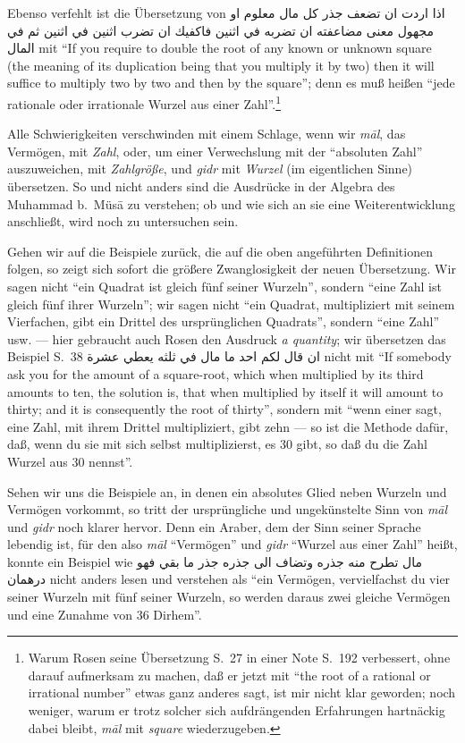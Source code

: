 \documentclass[11pt,a4paper]{article}
\newcommand{\RL}[1]{\beginR#1\endR}
\newcommand{\ar}[1]{{\arabicfont\RL{#1}}}
\newcommand{\enquote}[1]{``#1''}
\begin{document}
Ebenso verfehlt ist die \"Ubersetzung von \ar{اذا اردت ان تضعف جذر كل مال معلوم او مجهول معنى مضاعفته ان تضربه في اثنين فاكفيك ان تضرب اثنين في اثنين ثم في المال} mit \enquote{If you require to double the root of any known or unknown square (the meaning of its duplication being that you multiply it by two) then it will suffice to multiply two by two and then by the square}; denn es mu\ss{} hei\ss{}en \enquote{jede rationale oder irrationale Wurzel aus einer Zahl}.\footnote{Warum Rosen seine \"Ubersetzung S.\ 27 in einer Note S.\ 192 verbessert, ohne darauf aufmerksam zu machen, da\ss{} er jetzt mit \enquote{the root of a rational or irrational number} etwas ganz anderes sagt, ist mir nicht klar geworden; noch weniger, warum er trotz solcher sich aufdr\"angenden Erfahrungen hartn\"ackig dabei bleibt, \textit{m\=al} mit \textit{square} wiederzugeben.}

Alle Schwierigkeiten verschwinden mit einem Schlage, wenn wir \textit{m\=al}, das Verm\"ogen, mit \textit{Zahl}, oder, um einer Verwechslung mit der \enquote{absoluten Zahl} auszuweichen, mit \textit{Zahlgr\"o\ss{}e}, und \textit{gidr} mit \textit{Wurzel} (im eigentlichen Sinne) \"ubersetzen. So und nicht anders sind die Ausdr\"ucke in der Algebra des Muhammad b.\ M\"us\=a zu verstehen; ob und wie sich an sie eine Weiterentwicklung anschlie\ss{}t, wird noch zu untersuchen sein.

Gehen wir auf die Beispiele zur\"uck, die auf die oben angef\"uhrten Definitionen folgen, so zeigt sich sofort die gr\"o\ss{}ere Zwanglosigkeit der neuen \"Ubersetzung. Wir sagen nicht \enquote{ein Quadrat ist gleich f\"unf seiner Wurzeln}, sondern \enquote{eine Zahl ist gleich f\"unf ihrer Wurzeln}; wir sagen nicht \enquote{ein Quadrat, multipliziert mit seinem Vierfachen, gibt ein Drittel des urspr\"unglichen Quadrats}, sondern \enquote{eine Zahl} usw. --- hier gebraucht auch Rosen den Ausdruck \textit{a quantity}; wir \"ubersetzen das Beispiel S.\ 38 \ar{ان قال لكم احد ما مال في ثلثه يعطي عشرة} nicht mit \enquote{If somebody ask you for the amount of a square-root, which when multiplied by its third amounts to ten, the solution is, that when multiplied by itself it will amount to thirty; and it is consequently the root of thirty}, sondern mit \enquote{wenn einer sagt, eine Zahl, mit ihrem Drittel multipliziert, gibt zehn --- so ist die Methode daf\"ur, da\ss{}, wenn du sie mit sich selbst multiplizierst, es 30 gibt, so da\ss{} du die Zahl Wurzel aus 30 nennst}.

Sehen wir uns die Beispiele an, in denen ein absolutes Glied neben Wurzeln und Verm\"ogen vorkommt, so tritt der urspr\"ungliche und ungek\"unstelte Sinn von \textit{m\=al} und \textit{gidr} noch klarer hervor. Denn ein Araber, dem der Sinn seiner Sprache lebendig ist, f\"ur den also \textit{m\=al} \enquote{Verm\"ogen} und \textit{gidr} \enquote{Wurzel aus einer Zahl} hei\ss{}t, konnte ein Beispiel wie \ar{مال تطرح منه جذره وتضاف الى جذره جذر ما بقي فهو درهمان} nicht anders lesen und verstehen als \enquote{ein Verm\"ogen, vervielfachst du vier seiner Wurzeln mit f\"unf seiner Wurzeln, so werden daraus zwei gleiche Verm\"ogen und eine Zunahme von 36 Dirhem}.
\end{document}
